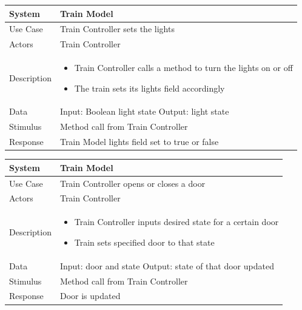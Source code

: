 \documentclass{article}
\begin{document}
    \begin{longtable}{
    || >{\raggedright\arraybackslash}m{}
    | >{\raggedright\arraybackslash}m{}||}
    \hline
    \textbf{System} &  \textbf{Train Model} \\
    \hline
    Use Case & Train Controller sets the lights\\
    \hline
    Actors & Train Controller\\
    \hline
    Description & \begin{itemize}
        \item Train Controller calls a method to turn the lights on or off
        \item The train sets its lights field accordingly
    \end{itemize}\\
    \hline
    Data & Input: Boolean light state \newline Output: light state\\
    \hline
    Stimulus & Method call from Train Controller\\
    \hline
    Response & Train Model lights field set to true or false\\
    \hline
    \end{longtable}
    
    \begin{longtable}{
    || >{\raggedright\arraybackslash}m{}
    | >{\raggedright\arraybackslash}m{}||}
    \hline
    \textbf{System} &  \textbf{Train Model} \\
    \hline
    Use Case & Train Controller opens or closes a door\\
    \hline
    Actors & Train Controller\\
    \hline
    Description & \begin{itemize}
        \item Train Controller inputs desired state for a certain door
        \item Train sets specified door to that state
    \end{itemize}\\
    \hline
    Data & Input: door and state \newline Output: state of that door updated\\
    \hline
    Stimulus & Method call from Train Controller\\
    \hline
    Response & Door is updated\\
    \hline
    \end{longtable}
    
\end{document}
